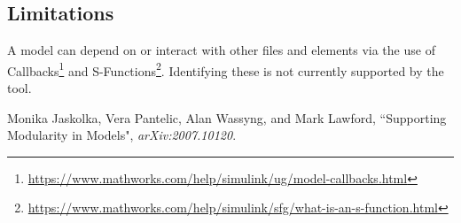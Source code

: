 \documentclass{article}
\begin{document}
\subsection{Limitations}
A \Simulink model can depend on or interact with other files and elements via the use of Callbacks\footnote{\url{https://www.mathworks.com/help/simulink/ug/model-callbacks.html}} and S-Functions\footnote{\url{https://www.mathworks.com/help/simulink/sfg/what-is-an-s-function.html}}. Identifying these is not currently supported by the tool.

\begin{thebibliography}{9}
Monika Jaskolka, Vera Pantelic, Alan Wassyng, and Mark Lawford, ``Supporting Modularity in \Simulink Models", \emph{arXiv:2007.10120}.
\end{thebibliography}
\end{document}
